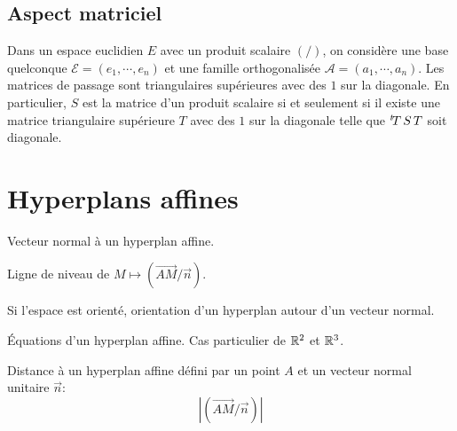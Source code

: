 \subsection{Aspect matriciel}
Dans un espace euclidien $E$ avec un produit scalaire $(/)$, on considère une base quelconque $\mathcal E = (e_1,\cdots,e_n)$ et une famille orthogonalisée $\mathcal A =(a_1,\cdots,a_n)$. Les matrices de passage sont triangulaires supérieures avec des $1$ sur la diagonale.\newline
En particulier, $S$ est la matrice d'un produit scalaire si et seulement si il existe une matrice triangulaire supérieure $T$ avec des $1$ sur la diagonale telle que  $\mathstrut^t\! T\,S\, T$ soit diagonale.

\section{Hyperplans affines}
Vecteur normal à un hyperplan affine.

Ligne de niveau de $M\mapsto (\overrightarrow{AM}/\overrightarrow{n})$.

Si l'espace est orienté, orientation d'un hyperplan autour d'un vecteur normal.

\'Equations d'un hyperplan affine. Cas particulier de $\mathbb{R}^2$ et $\mathbb{R}^3$.

Distance à un hyperplan affine défini par un point $A$ et un vecteur normal unitaire $\overrightarrow{n}$:
\begin{displaymath}
  \left| (\overrightarrow{AM}/\overrightarrow{n})\right|
\end{displaymath}



